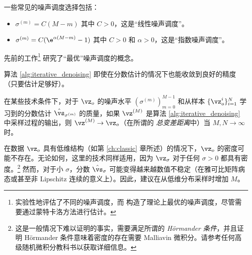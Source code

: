 \documentclass[../../book-main.tex]{subfiles}
\begin{document}
一些常见的噪声调度选择包括：
\begin{itemize}
    \item \(\sigma^{(m)} = C(M - m)\) 其中 \(C > 0\)，这是“线性噪声调度”。
    \item \(\sigma^{(m)} = C(\e^{\alpha (M - m)} - 1)\) 其中 \(C > 0\) 和 \(\alpha > 0\)，这是“指数噪声调度”。
\end{itemize}
先前的工作\footnote{\cite{karras2022elucidating} 实验性地评估了不同的噪声调度，而 \cite{bao2022analytic} 构造了理论上最优的噪声调度，尽管需要通过蒙特卡洛方法进行估计。} 研究了“最优”噪声调度的概念。

算法 \ref{alg:iterative_denoising} 即使在分数估计的情况下也能收敛到良好的精度（只要估计足够好）。
\begin{theorem}\label{thm:distribution-convergence}
    在某些技术条件下，对于 \(\vz_{o}\) 的噪声水平 \((\sigma^{(m)})_{m = 0}^{M - 1}\) 和从样本 \(\{\vz_{o}^{i}\}_{i = 1}^{N}\) 学习到的分数估计 \(\hat{\vs}_{\sigma^{(m)}}\) 的质量，如果 \(\vz^{(M)}\) 是算法 \ref{alg:iterative_denoising} 中采样过程的输出，则 \(\vz^{(M)} \to \vz_{o}\)（在所谓的 \textit{总变差距离}中）当 \(M, N \to \infty\) 时。
\end{theorem}

\begin{remark}
    在数据 \(\vz_{o}\) 具有低维结构（如第 \ref{ch:classic} 章所述）的情况下，\(\vz_{o}\) 的密度可能不存在。无论如何，这里的技术同样适用，因为 \(\vz_{\sigma}\) 对于任何 \(\sigma > 0\) 都具有密度。\footnote{这是一般情况下难以证明的事实，需要满足所谓的 \textit{H\"ormander 条件}，并且证明 H\"ormander 条件意味着密度的存在需要 Malliavin 微积分。请参考任何高级随机微积分教科书以获取详细信息。} 然而，对于小 \(\sigma\)，分数 \(\hat{\vs}_{\sigma}\) 可能变得越来越数值不稳定（在雅可比矩阵病态或甚至非 Lipschitz 连续的意义上）。因此，建议在从低维分布采样时增加 \(M\)。
\end{remark}
\end{document}
